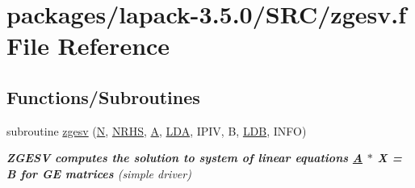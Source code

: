 \hypertarget{zgesv_8f}{}\section{packages/lapack-\/3.5.0/\+S\+R\+C/zgesv.f File Reference}
\label{zgesv_8f}
\subsection*{Functions/\+Subroutines}
\begin{DoxyCompactItemize}
\item 
subroutine \hyperlink{group__complex16GEsolve_ga531713dfc62bc5df387b7bb486a9deeb}{zgesv} (\hyperlink{polmisc_8c_a0240ac851181b84ac374872dc5434ee4}{N}, \hyperlink{example__user_8c_aa0138da002ce2a90360df2f521eb3198}{N\+R\+H\+S}, \hyperlink{classA}{A}, \hyperlink{example__user_8c_ae946da542ce0db94dced19b2ecefd1aa}{L\+D\+A}, I\+P\+I\+V, B, \hyperlink{example__user_8c_a50e90a7104df172b5a89a06c47fcca04}{L\+D\+B}, I\+N\+F\+O)
\begin{DoxyCompactList}\small\item\em {\bfseries  Z\+G\+E\+S\+V computes the solution to system of linear equations \hyperlink{classA}{A} $\ast$ X = B for G\+E matrices} (simple driver) \end{DoxyCompactList}\end{DoxyCompactItemize}
